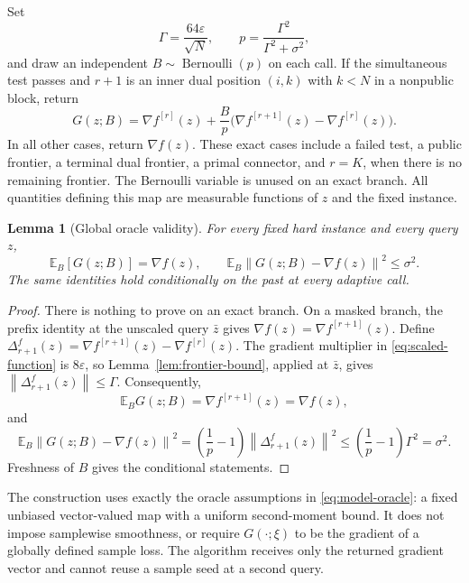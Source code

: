 \documentclass[11pt,a4paper]{article}
\newcommand{\E}{\mathbb E}
\newcommand{\eps}{\varepsilon}
\newcommand{\norm}[1]{\left\lVert #1\right\rVert}
\newtheorem{lemma}[theorem]{Lemma}
\theoremstyle{definition}
\theoremstyle{remark}
\numberwithin{equation}{section}
\begin{document}
Set
\begin{equation}
 \Gamma=\frac{64\eps}{\sqrt N},\qquad
 p=\frac{\Gamma^2}{\Gamma^2+\sigma^2},
 \label{eq:p-Gamma}
\end{equation}
and draw an independent $B\sim\operatorname{Bernoulli}(p)$ on each call.
If the simultaneous test passes and $r+1$ is an inner dual position
$(i,k)$ with $k<N$ in a nonpublic block, return
\begin{equation}
 G(z;B)=\nabla f^{[r]}(z)
   +\frac{B}{p}\bigl(\nabla f^{[r+1]}(z)-\nabla f^{[r]}(z)\bigr).
 \label{eq:fixed-oracle}
\end{equation}
In all other cases, return $\nabla f(z)$.  These exact cases include a failed
test, a public frontier, a terminal dual frontier, a primal connector, and
$r=K$, when there is no remaining frontier.  The Bernoulli variable is unused
on an exact branch.  All quantities defining this map are measurable
functions of $z$ and the fixed instance.

\begin{lemma}[Global oracle validity]
\label{lem:oracle-valid}
For every fixed hard instance and every query $z$,
\[
 \E_B[G(z;B)]=\nabla f(z),\qquad
 \E_B\norm{G(z;B)-\nabla f(z)}^2\le\sigma^2.
\]
The same identities hold conditionally on the past at every adaptive call.
\end{lemma}

\begin{proof}
There is nothing to prove on an exact branch.  On a masked branch, the
prefix identity at the unscaled query $\bar z$ gives
$\nabla f(z)=\nabla f^{[r+1]}(z)$.  Define
$\Delta^f_{r+1}(z)=\nabla f^{[r+1]}(z)-\nabla f^{[r]}(z)$.
The gradient multiplier in \eqref{eq:scaled-function} is $8\eps$, so
Lemma~\ref{lem:frontier-bound}, applied at $\bar z$, gives
$\norm{\Delta^f_{r+1}(z)}\le\Gamma$.  Consequently,
\[
 \E_B G(z;B)=\nabla f^{[r+1]}(z)=\nabla f(z),
\]
and
\[
 \E_B\norm{G(z;B)-\nabla f(z)}^2
 =\left(\frac1p-1\right)\norm{\Delta^f_{r+1}(z)}^2
 \le\left(\frac1p-1\right)\Gamma^2=\sigma^2.
\]
Freshness of $B$ gives the conditional statements.
\end{proof}

The construction uses exactly the oracle assumptions in
\eqref{eq:model-oracle}: a fixed unbiased vector-valued map with a uniform
second-moment bound.  It does not impose samplewise smoothness, or require
$G(\cdot;\xi)$ to be the gradient of a globally defined sample loss.  The
algorithm receives only the returned gradient vector and cannot reuse a
sample seed at a second query.
\end{document}
